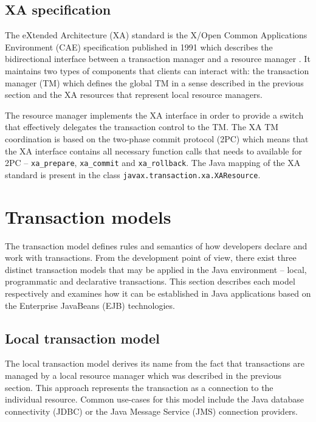 \documentclass[oneside,
  digital, %
  table,   %
  lof,     %
  lot,     %
]{fithesis3}
\begin{document}
\subsection{XA specification}

The eXtended Architecture (XA) standard is the X/Open Common Applications Environment (CAE) specification published in 1991 which describes the bidirectional interface between a transaction manager and a resource manager \cite{xa_spec}. It maintains two types of components that clients can interact with: the transaction manager (TM) which defines the global TM in a sense described in the previous section and the XA resources that represent local resource managers.

The resource manager implements the XA interface in order to provide a switch that effectively delegates the transaction control to the TM. The XA TM coordination is based on the two-phase commit protocol (2PC) which means that the XA interface contains all necessary function calls that needs to available for 2PC -- \texttt{xa\_prepare}, \texttt{xa\_commit} and \texttt{xa\_rollback}. The Java mapping of the XA standard is present in the class \texttt{javax.transaction.xa.XAResource}.



\section{Transaction models}

The transaction model defines rules and semantics of how developers declare and work with transactions. From the development point of view, there exist three distinct transaction models that may be applied in the Java environment -- local, programmatic and declarative transactions. This section describes each model respectively and examines how it can be established in Java applications based on the Enterprise JavaBeans (EJB) technologies.

\subsection{Local transaction model}

The local transaction model derives its name from the fact that transactions are managed by a local resource manager which was described in the previous section. This approach represents the transaction as a connection to the individual resource. Common use-cases for this model include the Java database connectivity (JDBC) or the Java Message Service (JMS) connection providers.
\end{document}
